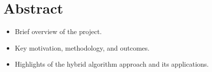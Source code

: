 \vspace{2in}
\chapter*{Abstract}
\begin{itemize}
	\item Brief overview of the project.
	\item Key motivation, methodology, and outcomes.
	\item Highlights of the hybrid algorithm approach and its applications.
\end{itemize}
